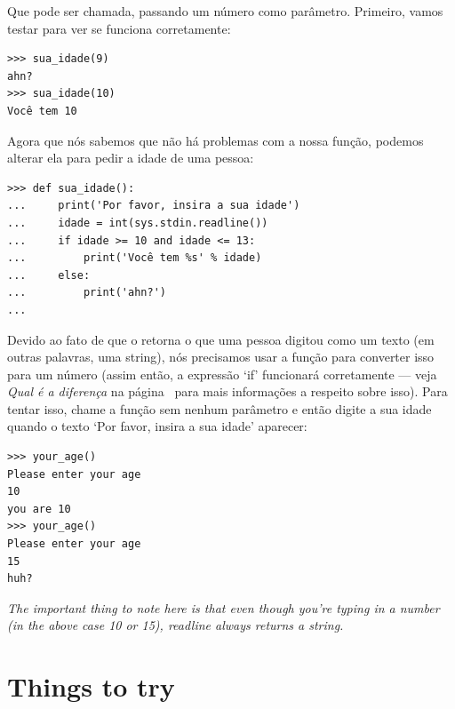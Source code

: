 Que pode ser chamada, passando um número como parâmetro. Primeiro, vamos testar para ver se funciona corretamente:

\begin{listing}
\begin{verbatim}
>>> sua_idade(9)
ahn?
>>> sua_idade(10)
Você tem 10
\end{verbatim}
\end{listing}

Agora que nós sabemos que não há problemas com a nossa função, podemos alterar ela para pedir a idade de uma pessoa:

\begin{listing}
\begin{verbatim}
>>> def sua_idade():
...     print('Por favor, insira a sua idade')
...     idade = int(sys.stdin.readline())
...     if idade >= 10 and idade <= 13:
...         print('Você tem %s' % idade)
...     else:
...         print('ahn?')
... 
\end{verbatim}
\end{listing}

Devido ao fato de que o  retorna o que uma pessoa digitou como um texto (em outras palavras, uma string), nós precisamos usar a função  para converter isso para um número (assim então, a expressão `if' funcionará corretamente --- veja \emph{Qual é a diferença} na página~\pageref{whatsthedifference} para mais informações a respeito sobre isso). Para tentar isso, chame a função  sem nenhum parâmetro e então digite a sua idade quando o texto `Por favor, insira a sua idade' aparecer:

\begin{listingignore}
\begin{verbatim}
>>> your_age()
Please enter your age
10
you are 10
>>> your_age()
Please enter your age
15
huh?
\end{verbatim}
\end{listingignore}

\noindent
\emph{The important thing to note here is that even though you're typing in a number (in the above case 10 or 15), readline always returns a string.}


\section{Things to try}

